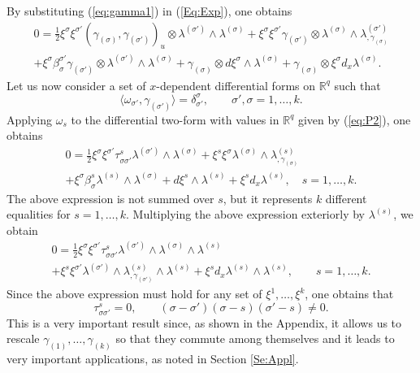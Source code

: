 \documentclass{birkjour}
\theoremstyle{definition}
\theoremstyle{remark}
\numberwithin{equation}{section}
\numberwithin{equation}{section}
\numberwithin{thm}{section}
\numberwithin{equation}{section}
\numberwithin{thm}{section}
\begin{document}
By substituting (\ref{eq:gamma1}) in (\ref{Eq:Exp}), one obtains
\begin{multline}\label{eq:P2}
	0= \frac 12\xi^{\sigma}\xi^{\sigma'}(\gamma_{(\sigma)},\gamma_{(\sigma')})_u\otimes \lambda^{(\sigma')}\wedge\lambda^{(\sigma)}+\xi^\sigma\xi^{\sigma'} \gamma_{(\sigma')}\otimes \lambda^{(\sigma)}\wedge \lambda_{,\gamma_{(\sigma)}}^{(\sigma')} 
	\\+\xi^\sigma\beta^{\sigma'}_\sigma\gamma_{(\sigma')}\otimes\lambda^{(\sigma')}\wedge\lambda^{(\sigma)}+\gamma_{(\sigma)}\otimes d\xi^\sigma\wedge\lambda^{(\sigma)}+\gamma_{(\sigma)}\otimes \xi^\sigma d_x\lambda^{(\sigma)}.
\end{multline}
Let us now consider a set of $x$-dependent differential forms on $\mathbb{R}^q$ such that
$$
\langle \omega_{\sigma'},\gamma_{(\sigma')}\rangle=\delta_{\sigma'}^\sigma,\qquad \sigma',\sigma=1,\ldots,k.
$$ Applying $\omega_s$ to the differential two-form with values in $\mathbb{R}^q$ given by (\ref{eq:P2}), one obtains
\begin{multline}\label{eq:P3}
	0=\frac 12\xi^{\sigma}\xi^{\sigma'}\tau_{\sigma\sigma'}^s \lambda^{(\sigma')}\wedge\lambda^{(\sigma)}+\xi^{s}\xi^{\sigma}\lambda^{(\sigma)}\wedge \lambda_{,\gamma_{(\sigma)}}^{(s)}\\+\xi^\sigma\beta^s_{\sigma}\lambda^{(s)}\wedge\lambda^{(\sigma)}+ d\xi^s\wedge\lambda^{(s)}+\xi^sd_x\lambda^{(s)},\quad s=1,\ldots,k.
\end{multline}
The above expression is not summed over $s$, but it represents $k$ different equalities for $s=1,\ldots,k$.
Multiplying the above expression exteriorly  by $\lambda^{(s)}$, we obtain
\begin{multline}
	\label{eq:P5}
	0=\frac 12\xi^{\sigma}\xi^{\sigma'}\tau_{\sigma\sigma'}^s \lambda^{(\sigma')}\wedge\lambda^{(\sigma)}\wedge\lambda^{(s)}\\+\xi^s\xi^{\sigma'} \lambda^{(\sigma')}\wedge \lambda_{,\gamma_{(\sigma')}}^{(s)}\wedge \lambda^{(s)}
	+\xi^sd_x\lambda^{(s)}\wedge\lambda^{(s)},\qquad s=1,\ldots,k.
\end{multline}
Since the above expression must hold for any set of  $\xi^1,\ldots,\xi^k$, one obtains that 
\begin{equation}\label{Eq:Con0}
	\tau_{\sigma\sigma'}^s=0,\qquad  (\sigma-\sigma')(\sigma-s)(\sigma'-s)\neq 0.
\end{equation}
This is a very important result since, as shown in the Appendix, it allows us to rescale $\gamma_{({1})},\ldots,\gamma_{(k)}$ so that they commute among themselves and it leads to very important applications, as noted in Section \ref{Se:Appl}. 
\end{document}
